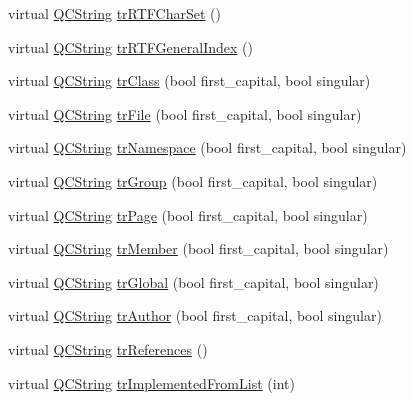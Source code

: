 \begin{DoxyCompactItemize}
\item 
virtual \mbox{\hyperlink{class_q_c_string}{Q\+C\+String}} \mbox{\hyperlink{class_translator_serbian_ae1bf7880d6f6e8dac043c21281106949}{tr\+R\+T\+F\+Char\+Set}} ()
\item 
virtual \mbox{\hyperlink{class_q_c_string}{Q\+C\+String}} \mbox{\hyperlink{class_translator_serbian_adba17de1ae92067d5f232050c650ae80}{tr\+R\+T\+F\+General\+Index}} ()
\item 
virtual \mbox{\hyperlink{class_q_c_string}{Q\+C\+String}} \mbox{\hyperlink{class_translator_serbian_a2d18b40458012ab26436f1eb0bd02bc9}{tr\+Class}} (bool first\+\_\+capital, bool singular)
\item 
virtual \mbox{\hyperlink{class_q_c_string}{Q\+C\+String}} \mbox{\hyperlink{class_translator_serbian_af0ea27663393602d5fd4c44416bf8a1c}{tr\+File}} (bool first\+\_\+capital, bool singular)
\item 
virtual \mbox{\hyperlink{class_q_c_string}{Q\+C\+String}} \mbox{\hyperlink{class_translator_serbian_a3f2c6a5a298660730c41a48913e0a74e}{tr\+Namespace}} (bool first\+\_\+capital, bool singular)
\item 
virtual \mbox{\hyperlink{class_q_c_string}{Q\+C\+String}} \mbox{\hyperlink{class_translator_serbian_a5266e88a507920e98812038495b6c8c9}{tr\+Group}} (bool first\+\_\+capital, bool singular)
\item 
virtual \mbox{\hyperlink{class_q_c_string}{Q\+C\+String}} \mbox{\hyperlink{class_translator_serbian_ac8d6bf1f73f589304b5ef733bccf12a2}{tr\+Page}} (bool first\+\_\+capital, bool singular)
\item 
virtual \mbox{\hyperlink{class_q_c_string}{Q\+C\+String}} \mbox{\hyperlink{class_translator_serbian_ad713ea1da4fa403235c44e1510c91ee4}{tr\+Member}} (bool first\+\_\+capital, bool singular)
\item 
virtual \mbox{\hyperlink{class_q_c_string}{Q\+C\+String}} \mbox{\hyperlink{class_translator_serbian_aef389e4a14e333ec9702960d4e8d9dd0}{tr\+Global}} (bool first\+\_\+capital, bool singular)
\item 
virtual \mbox{\hyperlink{class_q_c_string}{Q\+C\+String}} \mbox{\hyperlink{class_translator_serbian_a689feaebb833ec2ce0229e6b68cd3937}{tr\+Author}} (bool first\+\_\+capital, bool singular)
\item 
virtual \mbox{\hyperlink{class_q_c_string}{Q\+C\+String}} \mbox{\hyperlink{class_translator_serbian_a4fb8316e8cc5b607aa53c167807d8790}{tr\+References}} ()
\item 
virtual \mbox{\hyperlink{class_q_c_string}{Q\+C\+String}} \mbox{\hyperlink{class_translator_serbian_a22a952ce8035c1e99dd2e5b03191e43c}{tr\+Implemented\+From\+List}} (int)

\end{DoxyCompactItemize}
